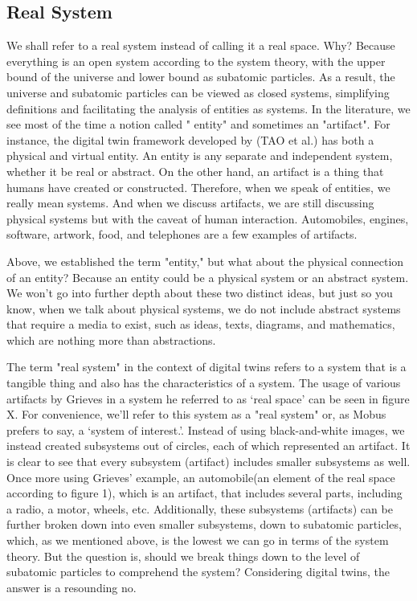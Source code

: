 \documentclass[9pt,conference]{IEEEtran}
\begin{document}
    \subsection{Real System}
    We shall refer to a real system instead of calling it a real space. 
    Why? Because everything is an open system according to the system theory, 
    with the upper bound of the universe and lower bound as subatomic particles.
    As a result, the universe and subatomic particles can be viewed as closed systems, 
    simplifying definitions and facilitating the analysis of entities as systems. 
    In the literature, we see most of the time a notion called " entity" and sometimes an "artifact". 
    For instance, the digital twin framework developed by (TAO et al.) has both a physical and virtual entity.
    An entity is any separate and independent system, whether it be real or abstract.
    On the other hand, an artifact is a thing that humans have created or constructed. 
    Therefore, when we speak of entities, we really mean systems. 
    And when we discuss artifacts, we are still discussing physical systems but with the caveat of human interaction. 
    Automobiles, engines, software, artwork, food, and telephones are a few examples of artifacts.

    Above, we established the term "entity," but what about the physical connection of an entity? 
    Because an entity could be a physical system or an abstract system. 
    We won't go into further depth about these two distinct ideas, but just so you know, 
    when we talk about physical systems, we do not include abstract systems that require a
    media to exist, such as ideas, texts, diagrams, and mathematics, which are nothing more than abstractions.

    The term "real system" in the context of digital twins refers to a system that is a tangible thing and also has 
    the characteristics of a system. The usage of various artifacts by Grieves in a system he referred to as `real space' 
    can be seen in figure X. 
    For convenience, we'll refer to this system as a "real system" or, as Mobus prefers to say, a `system of interest.'. 
    Instead of using black-and-white images, we instead created subsystems out of circles, each of which represented an artifact. 
    It is clear to see that every subsystem (artifact) includes smaller subsystems as well. 
    Once more using Grieves' example, an automobile(an element of the real space according to figure 1), 
    which is an artifact, that includes several parts, including a radio, a motor, wheels, etc. 
    Additionally, these subsystems (artifacts) can be further broken down into even smaller subsystems, 
    down to subatomic particles, which, as we mentioned above, is the lowest we can go in terms of the system theory. 
    But the question is, should we break things down to the level of subatomic particles to comprehend the system? Considering digital twins, 
    the answer is a resounding no.
\end{document}
